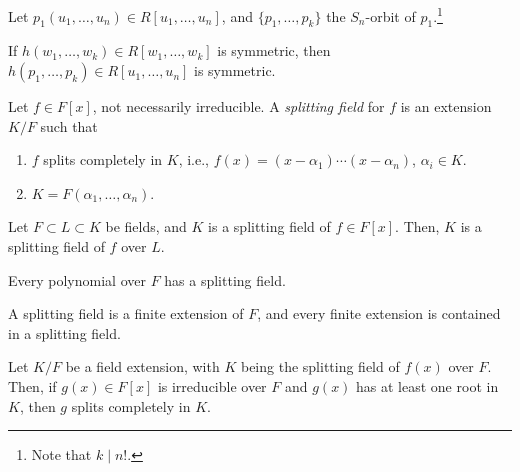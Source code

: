 \begin{cor}\label{l37:cor10}
	Let $p_1(u_1, \dots, u_n) \in R[u_1, \dots, u_n]$, and $\{p_1, \dots, p_k\}$ the  $S_n$-orbit of $p_1$.\footnote{Note that $k \mid n!$.}

	If $h(w_1, \dots, w_k) \in R[w_1, \dots, w_k]$ is symmetric, then $h(p_1, \dots, p_k) \in R[u_1, \dots, u_n]$ is symmetric.
\end{cor}

\begin{defn}
	Let $f \in F[x]$, not necessarily irreducible. A \emph{splitting field} for $f$ is an extension $K / F$ such that
	\begin{enumerate}
		\item $f$ splits completely in $K$, i.e., $f(x) = (x - \alpha_1)\cdots(x - \alpha_n)$, $\alpha_i \in K$. 
		\item $K = F(\alpha_1, \dots, \alpha_n)$.
	\end{enumerate}
\end{defn}

\begin{lem}
	Let $F \subset L \subset K$ be fields, and $K$ is a splitting field of $f \in F[x]$. Then,  $K$ is a splitting field of $f$ over $L$.
\end{lem}

\begin{lem}
	Every polynomial over $F$ has a splitting field.
\end{lem}

\begin{lem}
	A splitting field is a finite extension of $F$, and every finite extension is contained in a splitting field.
\end{lem}

\begin{thm}
	Let $K/F$ be a field extension, with  $K$ being the splitting field of $f(x)$ over $F$. Then, if $g(x) \in F[x]$ is irreducible over $F$ and  $g(x)$ has at least one root in $K$, then $g$ splits completely in $K$.
\end{thm}

